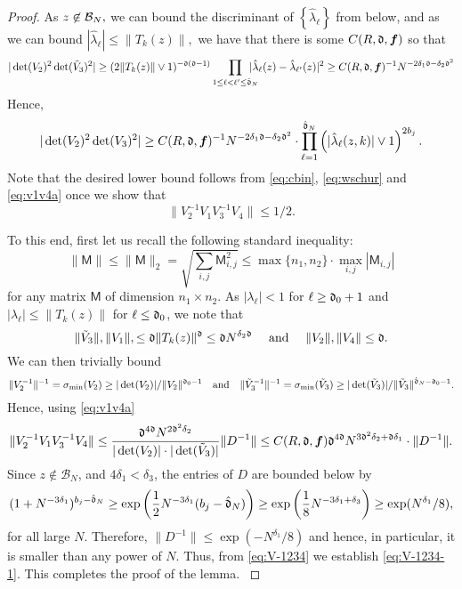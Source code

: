 \documentclass{amsart}
\numberwithin{equation}{section}
\def\corEE{\textcolor{amethyst}}
\def\corEE{}
\def\corAB{}
\def\corABa{}
\begin{document}
\begin{proof}
\corEE{
As $z \not\in \mathcal{B}_N,$ we can bound the discriminant of $\left\{ \hat{\lambda}_\ell \right\}$ from below, and as we can bound $|\hat{\lambda}_\ell| \leq \|T_k(z)\|,$ we have that there is some \corABa{$C(R,\mathfrak{d}, {\bm f})$} so that
\begin{equation}
  \label{eq:v1v4}
  \corABa{|\det(V_2)^2\det(\tilde V_3)^2|}
  \geq
  (2\|T_k(z)\| \vee 1)^{-\gd(\gd-1)}
  \prod_{1 \le \ell < \ell' \le \hat\gd_N}
  \hspace{-1em}
  |\hat{\lambda}_\ell(z) - \hat{\lambda}_{\ell'}(z)|^2
  \geq C(R,\gd,{\bm f})^{\corABa{-1}}N^{-2\delta_1 \gd - \delta_2 \gd^2}
\end{equation}
Hence,
\begin{equation}
  \label{eq:v1v4a}
  \corABa{|\det(V_2)^2\det(V_3)^2|} \geq C(R,\gd,{\bm f})^{\corABa{-1}}N^{-2\delta_1 \gd- \delta_2 \gd^2}
  \cdot \prod_{\ell=1}^{\corAB{\hat\gd_N}} \left( |\hat{\lambda}_\ell (z,k)| \vee 1\right)^{2b_j}.
\end{equation}
\corABa{Note that the desired lower bound follows from \eqref{eq:cbin}, \eqref{eq:wschur} and \eqref{eq:v1v4a} once we show that
\begin{equation}\label{eq:V-1234-1}
\|V_2^{-1} V_1 V_3^{-1} V_4 \| \le 1/2.
\end{equation}}
}

\corABa{To this end, first let us recall the following standard inequality:
\[
\| \mathsf{M}\| \le \| \mathsf{M}\|_2 = \sqrt{\sum_{i,j} \mathsf{M}_{i,j}^2} \le \max\{n_1,n_2\}\cdot \max_{i,j} |\mathsf{M}_{i,j}|
\]
for any matrix $ \mathsf{M}$ of dimension $n_1 \times n_2$. As $|\lambda_\ell| < 1$ for $\ell \ge \mathfrak{d}_0+1$ and $|\lambda_\ell| \le \|T_k(z)\|$ for $\ell \le \mathfrak{d}_0$, we note that
\[
\|\tilde V_3\|,\|V_1\|, \le \mathfrak{d} \| T_k(z)\|^{\mathfrak{d}} \le \mathfrak{d} N^{\delta_2 \mathfrak{d}} \quad \text{ and } \quad \| V_2 \| , \|V_4\| \le \mathfrak{d}.
\]
}
\corABa{We can then trivially bound
\[
\|V_2^{-1}\|^{-1} =  \sigma_{\text{min}}(V_2) \geq	|\det(V_2)|/\|V_2\|^{\mathfrak{d}_0 - 1}
  \quad\text{and}\quad
  \|\tilde V_3^{-1}\|^{-1}=\sigma_{\text{min}}(\tilde V_3) \geq	|\det(\tilde V_3)|/\|\tilde V_3\|^{\hat{\mathfrak{d}}_N - \mathfrak{d}_0 - 1}.
\]
Hence, \corABa{using \eqref{eq:v1v4a}}
\begin{equation}\label{eq:V-1234}
  \|V_2^{-1}V_1 V_3^{-1} V_4\| \leq
  \frac{\mathfrak{d}^{4 \mathfrak{d}} N^{2 \mathfrak{d}^2\delta_2}}
  {|\det(V_2)|\cdot|\det(\tilde V_3)|} \|D^{-1}\| \le C(R,\mathfrak{d},{\bm f}) \mathfrak{d}^{4 \mathfrak{d}} N^{3\mathfrak{d}^2\delta_2+ \mathfrak{d} \delta_1} \cdot \|D^{-1}\|.
\end{equation}
Since $z \notin \mathcal{B}_N$, and $4 \delta_1 <\delta_3$, the entries of $D$ are bounded below by
\[(1+N^{-3\delta_1})^{b_j - \hat{\mathfrak{d}}_N} \ge \exp\left(\frac12 N^{-3\delta_1} (b_j -\hat{\mathfrak{d}}_N)\right) \ge \exp \left(\frac18 N^{-3\delta_1 +\delta_3}\right) \ge \exp (N^{\delta_1}/8),
\]
for all large $N$. Therefore, $\|D^{-1}\| \le \exp(-N^{\delta_1}/8)$ and hence, in particular, it is smaller than any power of $N$. Thus, from \eqref{eq:V-1234} we establish  \eqref{eq:V-1234-1}. This completes the proof of the lemma.
}
 \end{proof}
\end{document}
